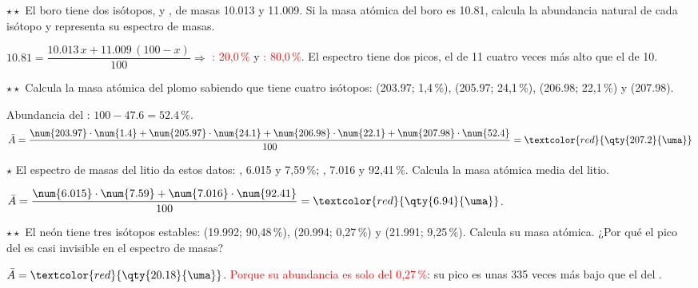 \begin{exercise}
    \(\star\star\) El boro tiene dos isótopos,  y , de masas \qty{10.013}{\uma} y \qty{11.009}{\uma}. Si
    la masa atómica del boro es \qty{10.81}{\uma}, calcula la abundancia natural de cada isótopo y representa su espectro de masas.
    \begin{solu}
        \(\num{10.81} = \dfrac{\num{10.013}\,x + \num{11.009}\,(100 - x)}{100}\Rightarrow\) \textcolor{red}{: 20,0\,\%}
        y \textcolor{red}{: 80,0\,\%}. El espectro tiene dos picos, el de 11 cuatro veces más alto que el de 10.
    \end{solu}
\end{exercise}

\begin{exercise}
    \(\star\star\) Calcula la masa atómica del plomo sabiendo que tiene cuatro isótopos:  (\qty{203.97}{\uma};
    1,4\,\%),  (\qty{205.97}{\uma}; 24,1\,\%),  (\qty{206.98}{\uma}; 22,1\,\%) y 
    (\qty{207.98}{\uma}).
    \begin{solu}
        Abundancia del : \(100 - \num{47.6} = \num{52.4}\)\,\%.
        \[ \bar{A} = \frac{\num{203.97} \cdot \num{1.4} + \num{205.97} \cdot \num{24.1} + \num{206.98} \cdot \num{22.1} + \num{207.98} \cdot \num{52.4}}{100}
        = \textcolor{red}{\qty{207.2}{\uma}} \]
    \end{solu}
\end{exercise}

\begin{exercise}
    \(\star\) El espectro de masas del litio da estos datos: , \qty{6.015}{\uma} y 7,59\,\%; ,
    \qty{7.016}{\uma} y 92,41\,\%. Calcula la masa atómica media del litio.
    \begin{solu}
        \(\bar{A} = \dfrac{\num{6.015} \cdot \num{7.59} + \num{7.016} \cdot \num{92.41}}{100} = \textcolor{red}{\qty{6.94}{\uma}}\).
    \end{solu}
\end{exercise}

\begin{exercise}
    \(\star\star\) El neón tiene tres isótopos estables:  (\qty{19.992}{\uma}; 90,48\,\%), 
    (\qty{20.994}{\uma}; 0,27\,\%) y  (\qty{21.991}{\uma}; 9,25\,\%). Calcula su masa atómica. ¿Por qué el pico del
     es casi invisible en el espectro de masas?
    \begin{solu}
        \(\bar{A} = \textcolor{red}{\qty{20.18}{\uma}}\). \textcolor{red}{Porque su abundancia es solo del 0,27\,\%}: su pico es
        unas 335 veces más bajo que el del .
    \end{solu}
\end{exercise}

